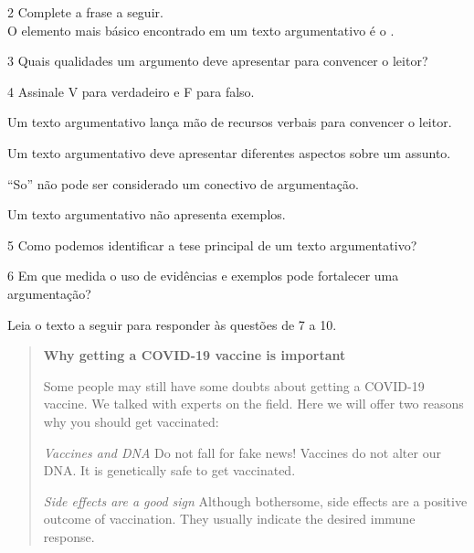 \num{2} Complete a frase a seguir.\\
O elemento mais básico encontrado em um texto argumentativo é o \preencher.


\num{3} Quais qualidades um argumento deve apresentar para convencer o leitor?



\num{4} Assinale V para verdadeiro e F para falso.

\begin{boxlist}
\item Um texto argumentativo lança mão de recursos verbais para
convencer o leitor. 

\item Um texto argumentativo deve apresentar diferentes aspectos sobre
um assunto. 

\item ``So'' não pode ser considerado um conectivo de argumentação. 

\item Um texto argumentativo não apresenta exemplos. 
\end{boxlist}

\num{5} Como podemos identificar a tese principal de um texto argumentativo?



\num{6} Em que medida o uso de evidências e exemplos pode fortalecer uma argumentação?



Leia o texto a seguir para responder às questões de 7 a 10.

\begin{quote}
\textbf{Why getting a COVID-19 vaccine is important}

Some people may still have some doubts about getting a COVID-19 vaccine. We talked with experts on the field. Here we will offer two reasons why you should get vaccinated:

\textit{Vaccines and DNA}
Do not fall for fake news! Vaccines do not alter our DNA. It is genetically safe to get vaccinated.

\textit{Side effects are a good sign}
Although bothersome, side effects are a positive outcome of vaccination. They usually indicate the desired immune response.

\end{quote}

